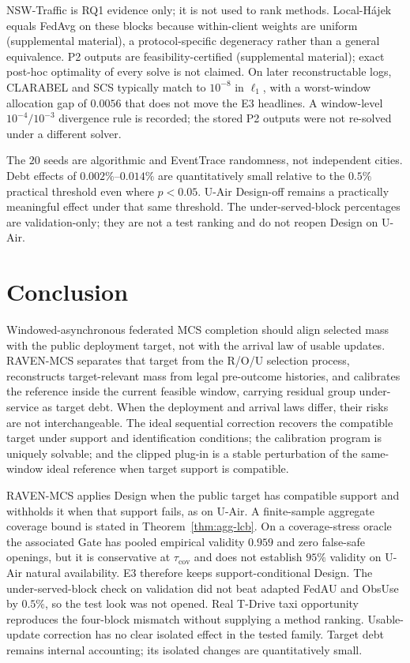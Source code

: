\documentclass[letterpaper,journal]{IEEEtran}
\begin{document}
NSW-Traffic is RQ1 evidence only; it is not used to rank methods.
Local-H\'ajek equals FedAvg on these blocks because within-client
weights are uniform (supplemental material), a
protocol-specific degeneracy rather than a general equivalence.
P2 outputs are feasibility-certified
(supplemental material); exact post-hoc optimality of every
solve is not claimed.  On later reconstructable logs, CLARABEL and SCS
typically match to $10^{-8}$ in $\ell_1$, with a worst-window
allocation gap of $0.0056$ that does not move the E3 headlines.  A window-level $10^{-4}/10^{-3}$ divergence rule is
recorded; the stored P2 outputs were not re-solved under a different solver.

The $20$ seeds are algorithmic and EventTrace randomness, not
independent cities.  Debt effects of $0.002\%$--$0.014\%$ are
quantitatively small relative to the $0.5\%$ practical threshold even
where $p<0.05$.  U-Air Design-off remains a practically meaningful
effect under that same threshold.  The under-served-block percentages
are validation-only; they are not a test ranking and do not reopen
Design on U-Air.


\section{Conclusion}
\label{sec:conclusion}

Windowed-asynchronous federated MCS completion should align selected
mass with the public deployment target, not with the arrival law of
usable updates.  RAVEN-MCS separates that target from the R/O/U
selection process, reconstructs target-relevant mass from legal
pre-outcome histories, and calibrates the reference inside the current
feasible window, carrying residual group under-service as target debt.
When the deployment and arrival laws differ, their risks are not
interchangeable.  The ideal sequential correction recovers the
compatible target under support and identification conditions; the
calibration program is uniquely solvable; and the clipped plug-in is a
stable perturbation of the same-window ideal reference when target
support is compatible.

RAVEN-MCS applies Design when the public target has compatible support
and withholds it when that support fails, as on U-Air.  A finite-sample
aggregate coverage bound is stated in Theorem~\ref{thm:agg-lcb}.  On a
coverage-stress oracle the associated Gate has pooled empirical validity
$0.959$ and zero false-safe openings, but it is conservative at
$\tau_{\mathrm{cov}}$ and does not establish $95\%$ validity on U-Air
natural availability.  E3 therefore keeps support-conditional Design.
The under-served-block check on validation did not beat adapted FedAU and
ObsUse by $0.5\%$, so the test look was not opened.  Real T-Drive taxi
opportunity reproduces the four-block
mismatch without supplying a method ranking.  Usable-update correction has no clear isolated effect in the tested
family.  Target debt remains internal accounting; its isolated changes
are quantitatively small.
\end{document}
